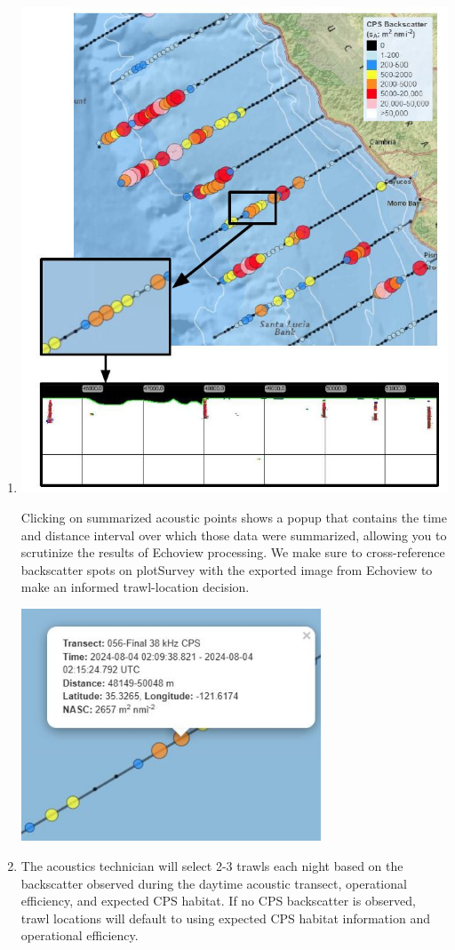 \documentclass[
  letterpaper,
  oneside,
  open=any]{scrbook}
\begin{document}
\begin{enumerate}
\def\labelenumi{\arabic{enumi}.}
\item
  \includegraphics[width=5.63542in,height=\textheight]{content/images/trawl-selection-plotsurvey-056C.JPG}

  Clicking on summarized acoustic points shows a popup that contains the
  time and distance interval over which those data were summarized,
  allowing you to scrutinize the results of Echoview processing. We make
  sure to cross-reference backscatter spots on plotSurvey with the
  exported image from Echoview to make an informed trawl-location
  decision.

  \includegraphics[width=3.51042in,height=\textheight]{content/images/trawl-selection-plotsurvey-backscatter.JPG}
\item
  The acoustics technician will select 2-3 trawls each night based on
  the backscatter observed during the daytime acoustic transect,
  operational efficiency, and expected CPS habitat. If no CPS
  backscatter is observed, trawl locations will default to using
  expected CPS habitat information and operational efficiency.
\end{enumerate}
\end{document}
